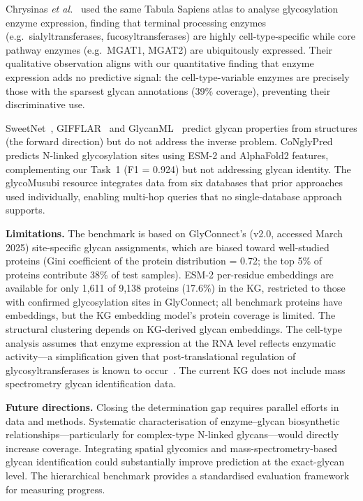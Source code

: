 \documentclass[11pt,a4paper]{article}
\begin{document}
Chrysinas \textit{et al.}~\cite{chrysinas2024} used the same Tabula Sapiens
atlas to analyse glycosylation enzyme expression, finding that terminal
processing enzymes (e.g.\ sialyltransferases, fucosyltransferases) are highly
cell-type-specific while core pathway enzymes (e.g.\ MGAT1, MGAT2) are
ubiquitously expressed. Their qualitative observation aligns with our
quantitative finding that enzyme expression adds no predictive signal: the
cell-type-variable enzymes are precisely those with the sparsest glycan
annotations (39\% coverage), preventing their discriminative use.

SweetNet~\cite{burkholz2022}, GIFFLAR~\cite{thomes2024} and
GlycanML~\cite{glyml2024} predict glycan properties from structures (the forward
direction) but do not address the inverse problem. CoNglyPred~\cite{congly2025}
predicts N-linked glycosylation sites using ESM-2 and AlphaFold2 features,
complementing our Task~1 (F1 = 0.924) but not addressing glycan identity. The
glycoMusubi resource integrates data from six databases that prior approaches used
individually, enabling multi-hop queries that no single-database approach
supports.

\textbf{Limitations.} The benchmark is based on GlyConnect's (v2.0, accessed
March 2025) site-specific glycan assignments, which are biased toward
well-studied proteins (Gini coefficient of the protein distribution = 0.72;
the top 5\% of proteins contribute 38\% of test samples). ESM-2 per-residue embeddings are available for only 1,611
of 9,138 proteins (17.6\%) in the KG, restricted to those with confirmed
glycosylation sites in GlyConnect; all benchmark proteins have embeddings, but
the KG embedding model's protein coverage is limited. The structural clustering
depends on KG-derived glycan embeddings. The cell-type analysis assumes that
enzyme expression at the RNA level reflects enzymatic activity---a simplification
given that post-translational regulation of glycosyltransferases is known to
occur~\cite{schjoldager2020}. The current KG does not include mass spectrometry
glycan identification data.

\textbf{Future directions.} Closing the determination gap requires parallel
efforts in data and methods. Systematic characterisation of enzyme--glycan
biosynthetic relationships---particularly for complex-type N-linked
glycans---would directly increase coverage. Integrating spatial glycomics and
mass-spectrometry-based glycan identification could substantially improve
prediction at the exact-glycan level. The hierarchical benchmark provides a
standardised evaluation framework for measuring progress.
\end{document}
